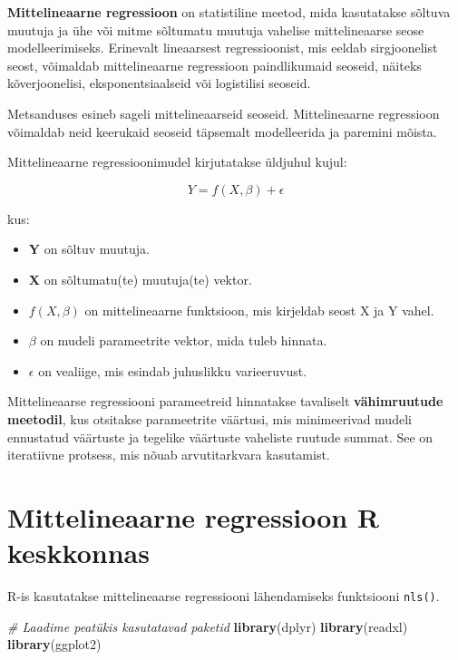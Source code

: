 \documentclass[
]{book}
\newenvironment{Shaded}{\begin{snugshade}}{\end{snugshade}}
\newcommand{\CommentTok}[1]{\textcolor[rgb]{0.56,0.35,0.01}{\textit{#1}}}
\newcommand{\FunctionTok}[1]{\textcolor[rgb]{0.13,0.29,0.53}{\textbf{#1}}}
\newcommand{\NormalTok}[1]{#1}
\providecommand{\tightlist}{%
  \setlength{\itemsep}{0pt}\setlength{\parskip}{0pt}}
\renewenvironment{Shaded} {\begin{snugshade}\footnotesize} {\end{snugshade}}
\begin{document}
\textbf{Mittelineaarne regressioon} on statistiline meetod, mida kasutatakse sõltuva muutuja ja ühe või mitme sõltumatu muutuja vahelise mittelineaarse seose modelleerimiseks. Erinevalt lineaarsest regressioonist, mis eeldab sirgjoonelist seost, võimaldab mittelineaarne regressioon paindlikumaid seoseid, näiteks kõverjoonelisi, eksponentsiaalseid või logistilisi seoseid.

Metsanduses esineb sageli mittelineaarseid seoseid. Mittelineaarne regressioon võimaldab neid keerukaid seoseid täpsemalt modelleerida ja paremini mõista.

Mittelineaarne regressioonimudel kirjutatakse üldjuhul kujul:

\[Y = f(X, \beta) + \epsilon\]

kus:

\begin{itemize}
\tightlist
\item
  \textbf{Y} on sõltuv muutuja.
\item
  \textbf{X} on sõltumatu(te) muutuja(te) vektor.
\item
  \textbf{\(f(X, \beta)\)} on mittelineaarne funktsioon, mis kirjeldab seost X ja Y vahel.
\item
  \textbf{\(\beta\)} on mudeli parameetrite vektor, mida tuleb hinnata.
\item
  \textbf{\(\epsilon\)} on vealiige, mis esindab juhuslikku varieeruvust.
\end{itemize}

Mittelineaarse regressiooni parameetreid hinnatakse tavaliselt \textbf{vähimruutude meetodil}, kus otsitakse parameetrite väärtusi, mis minimeerivad mudeli ennustatud väärtuste ja tegelike väärtuste vaheliste ruutude summat. See on iteratiivne protsess, mis nõuab arvutitarkvara kasutamist.

\section{Mittelineaarne regressioon R keskkonnas}\label{mittelineaarne-regressioon-r-keskkonnas}

R-is kasutatakse mittelineaarse regressiooni lähendamiseks funktsiooni \texttt{nls()}.

\begin{Shaded}
\begin{Highlighting}[]
\CommentTok{\# Laadime peatükis kasutatavad paketid}
\FunctionTok{library}\NormalTok{(dplyr)}
\FunctionTok{library}\NormalTok{(readxl)}
\FunctionTok{library}\NormalTok{(ggplot2)}
\end{Highlighting}
\end{Shaded}
\end{document}
